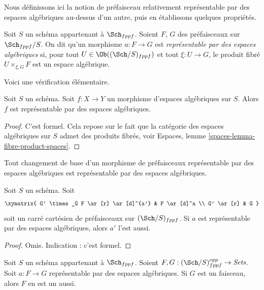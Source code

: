 \noindent
Nous définissons ici la notion de préfaisceau relativement représentable
par des espaces algébriques au-dessus d'un autre, puis en établissons quelques propriétés.

\begin{definition}
\label{definition-morphism-representable-by-spaces}
Soit $S$ un schéma appartenant à $\Sch_{fppf}$.
Soient $F$, $G$ des préfaisceaux sur $\Sch_{fppf}/S$.
On dit qu'un morphisme $a : F \to G$ est
{\it représentable par des espaces algébriques}
si, pour tout $U \in \Ob((\Sch/S)_{fppf})$ et
tout $\xi : U \to G$, le produit fibré $U \times_{\xi, G} F$
est un espace algébrique.
\end{definition}

\noindent
Voici une vérification élémentaire.

\begin{lemma}
\label{lemma-morphism-spaces-is-representable-by-spaces}
Soit $S$ un schéma.
Soit $f : X \to Y$ un morphisme d'espaces algébriques sur $S$.
Alors $f$ est représentable par des espaces algébriques.
\end{lemma}

\begin{proof}
C'est formel. Cela repose sur le fait que
la catégorie des espaces algébriques sur $S$ admet des produits fibrés, voir
Espaces, lemme \ref{spaces-lemma-fibre-product-spaces}.
\end{proof}

\begin{lemma}
\label{lemma-base-change-transformation}
\begin{slogan}
Tout changement de base d'un morphisme de préfaisceaux représentable
par des espaces algébriques est représentable par des espaces algébriques.
\end{slogan}
Soit $S$ un schéma. Soit
$$
\xymatrix{
G' \times_G F \ar[r] \ar[d]^{a'} & F \ar[d]^a \\
G' \ar[r] & G
}
$$
soit un carré cartésien de préfaisceaux sur $(\Sch/S)_{fppf}$.
Si $a$ est représentable par des espaces algébriques, alors $a'$ l'est aussi.
\end{lemma}

\begin{proof}
Omis. Indication : c'est formel.
\end{proof}

\begin{lemma}
\label{lemma-representable-by-spaces-transformation-to-sheaf}
Soit $S$ un schéma appartenant à $\Sch_{fppf}$.
Soient $F, G : (\Sch/S)_{fppf}^{opp} \to \textit{Sets}$.
Soit $a : F \to G$ représentable par des espaces algébriques.
Si $G$ est un faisceau, alors $F$ en est un aussi.
\end{lemma}

